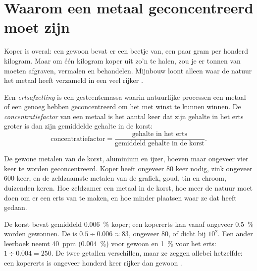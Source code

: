 \section{Waarom een metaal geconcentreerd moet zijn}

Koper is overal: een gewoon  bevat er een beetje van, een paar
gram per honderd kilogram. Maar om één kilogram koper uit zo'n  te
halen, zou je er tonnen van moeten afgraven, vermalen en behandelen.
Mijnbouw loont alleen waar de natuur het metaal heeft verzameld in een veel
rijker .

\begin{definition}\label{def:g9:earth-resources:ore-deposit}
Een \emph{ertsafzetting} is een gesteentemassa waarin
natuurlijke processen een metaal of een  genoeg hebben
geconcentreerd om het met winst te kunnen winnen. De
\emph{concentratiefactor} van een metaal is het
aantal keer dat zijn gehalte in het erts groter is dan zijn gemiddelde
gehalte in de korst:
\[
\text{concentratiefactor} = \frac{\text{gehalte in het erts}}{\text{gemiddeld gehalte in de korst}} .
\]
\end{definition}

De gewone metalen van de korst, aluminium en ijzer, hoeven maar ongeveer
vier keer te worden geconcentreerd. Koper heeft ongeveer 80 keer nodig,
zink ongeveer 600 keer, en de zeldzaamste metalen van de grafiek, goud,
tin en chroom, duizenden keren. Hoe zeldzamer een metaal in de korst, hoe
meer de natuur moet doen om er een erts van te maken, en hoe minder
plaatsen waar ze dat heeft gedaan.

\begin{example}[Koper]
De korst bevat gemiddeld \qty{0.006}{\%} koper; een kopererts kan vanaf
ongeveer \qty{0.5}{\%} worden gewonnen. De  is $0.5 \div 0.006
\approx 83$, ongeveer 80, of dicht bij $10^2$. Een ander leerboek neemt
\qty{40}{ppm} (\qty{0.004}{\%}) voor gewoon  en \qty{1}{\%} voor
het erts: $1 \div
0.004 = 250$. De twee getallen verschillen, maar ze zeggen allebei
hetzelfde: een kopererts is ongeveer honderd keer rijker dan gewoon
.
\end{example}

